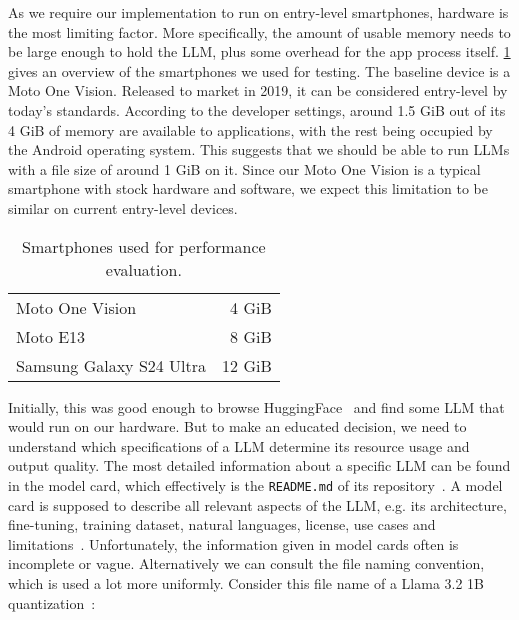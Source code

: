 As we require our implementation to run on entry-level smartphones, hardware is the most limiting factor. More specifically, the amount of usable memory needs to be large enough to hold the \gls{LLM}, plus some overhead for the app process itself. \cref{tab:smartphones} gives an overview of the smartphones we used for testing. The baseline device is a Moto One Vision. Released to market in 2019, it can be considered entry-level by today's standards. According to the developer settings, around 1.5 GiB out of its 4 GiB of memory are available to applications, with the rest being occupied by the Android operating system. This suggests that we should be able to run \glspl{LLM} with a file size of around 1 GiB on it. Since our Moto One Vision is a typical smartphone with stock hardware and software, we expect this limitation to be similar on current entry-level devices.

\begin{table}
	\centering
	\begin{tabular}{@{} lr @{}} %
		\toprule
		\tableheadline{Device} & \tableheadline{Memory} \\
		\midrule
		Moto One Vision          &  4 GiB \\
		Moto E13                 &  8 GiB \\
		Samsung Galaxy S24 Ultra & 12 GiB \\
		\bottomrule
	\end{tabular}
	\caption[Smartphones]{Smartphones used for performance evaluation.}
	\label{tab:smartphones}
\end{table}

Initially, this was good enough to browse HuggingFace~\cite{huggingfaceModelsHuggingFace2025} and find some \gls{LLM} that would run on our hardware. But to make an educated decision, we need to understand which specifications of a \gls{LLM} determine its resource usage and output quality. The most detailed information about a specific \gls{LLM} can be found in the model card, which effectively is the \lstinline|README.md| of its repository~\cite{mitchellModelCardsModel2019,huggingfaceModelCards}. A model card is supposed to describe all relevant aspects of the \gls{LLM}, e.g. its architecture, fine-tuning, training dataset, natural languages, license, use cases and limitations~\cite{mitchellModelCardsModel2019,huggingfaceModelCards}. Unfortunately, the information given in model cards often is incomplete or vague. Alternatively we can consult the file naming convention, which is used a lot more uniformly. Consider this file name of a Llama 3.2 1B quantization~\cite{gerganovGgerganovGgml2024,huggingfaceGGUF}:

